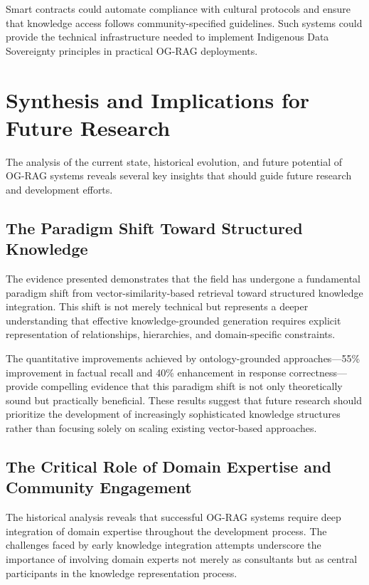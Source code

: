 Smart contracts could automate compliance with cultural protocols and ensure that knowledge access follows community-specified guidelines. Such systems could provide the technical infrastructure needed to implement Indigenous Data Sovereignty principles in practical OG-RAG deployments.

\section{Synthesis and Implications for Future Research}

The analysis of the current state, historical evolution, and future potential of OG-RAG systems reveals several key insights that should guide future research and development efforts.

\subsection{The Paradigm Shift Toward Structured Knowledge}

The evidence presented demonstrates that the field has undergone a fundamental paradigm shift from vector-similarity-based retrieval toward structured knowledge integration. This shift is not merely technical but represents a deeper understanding that effective knowledge-grounded generation requires explicit representation of relationships, hierarchies, and domain-specific constraints.

The quantitative improvements achieved by ontology-grounded approaches—55\% improvement in factual recall and 40\% enhancement in response correctness—provide compelling evidence that this paradigm shift is not only theoretically sound but practically beneficial. These results suggest that future research should prioritize the development of increasingly sophisticated knowledge structures rather than focusing solely on scaling existing vector-based approaches.

\subsection{The Critical Role of Domain Expertise and Community Engagement}

The historical analysis reveals that successful OG-RAG systems require deep integration of domain expertise throughout the development process. The challenges faced by early knowledge integration attempts underscore the importance of involving domain experts not merely as consultants but as central participants in the knowledge representation process.

